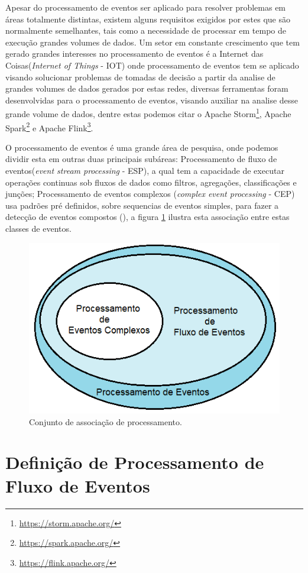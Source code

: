 \documentclass[tid,table]{texufpel} %
\begin{document}
Apesar do processamento de eventos ser aplicado para resolver problemas em áreas totalmente distintas, existem alguns requisitos exigidos por estes que são normalmente semelhantes, tais como a necessidade de processar em tempo de execução grandes volumes de dados. Um setor em constante  crescimento que tem gerado grandes interesses no processamento de eventos é a Internet das Coisas(\textit{Internet of Things} - IOT) onde processamento de eventos tem se aplicado visando solucionar problemas de tomadas de decisão a partir da analise de grandes volumes de dados gerados por estas redes, diversas ferramentas foram desenvolvidas para o processamento de eventos, visando auxiliar na analise desse grande volume de dados, dentre estas podemos citar o Apache Storm\footnote{\url{https://storm.apache.org/}}, Apache Spark\footnote{\url{https://spark.apache.org/}} e Apache Flink\footnote{\url{https://flink.apache.org/}}.

O processamento de eventos é uma grande área de pesquisa, onde podemos dividir esta em outras duas principais subáreas: Processamento de fluxo de eventos(\textit{event stream processing} - ESP), a qual tem a capacidade de executar operações continuas sob fluxos de dados como filtros, agregações, classificações e junções; Processamento de eventos complexos (\textit{complex event processing} - CEP) usa padrões pré definidos, sobre sequencias de eventos simples, para fazer a detecção de eventos compostos (\cite{dayarathna2018recent}), a figura \ref{fig:ConjuntoProcessamento} ilustra esta associação entre estas classes de eventos.


\begin{figure}[ht]
	\centering
	\includegraphics[width=.6\textwidth]{imagens/ConjuntoProcessamento.png}
	\caption{Conjunto de associação de processamento.}
	\label{fig:ConjuntoProcessamento}
\end{figure}


\section{Definição de Processamento de Fluxo de Eventos}
\end{document}
